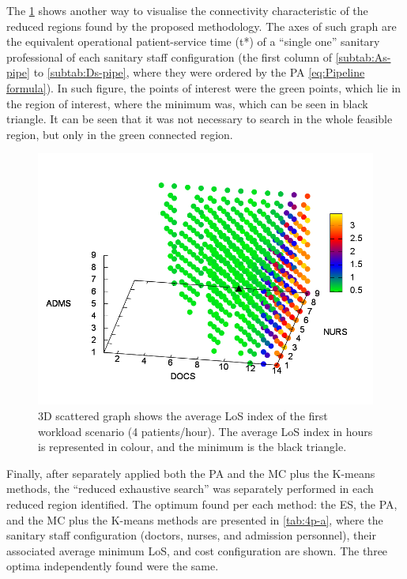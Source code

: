 The \ref{fig:3D-scattered-graph-25} shows another way to visualise
the connectivity characteristic of the reduced regions found by the
proposed methodology. The axes of such graph are the equivalent operational
patient-service time \foreignlanguage{american}{(t{*})} of a ``single
one'' sanitary professional of each sanitary staff configuration
(the first column of \ref{subtab:As-pipe} to \ref{subtab:Ds-pipe},
where they were ordered by the PA \ref{eq:Pipeline formula}). In
such figure, the points of interest were the green points, which lie
in the region of interest, where the minimum was, which can be seen
in black triangle. It can be seen that it was not necessary to search
in the whole feasible region, but only in the green connected region. 

\begin{figure}[h]
\noindent \begin{centering}
\includegraphics[width=0.95\columnwidth,height=0.2\paperheight]{figs4/v0/6400-602-25-3D-scatter-LoS2}
\par\end{centering}

\caption{3D scattered graph shows the average LoS index of the first workload
scenario (4 patients/hour). The average LoS index in hours is represented
in colour, and the minimum is the black triangle.\label{fig:3D-scattered-graph-25} }
\end{figure}


Finally, after separately applied both the PA and the MC plus the
K-means methods, the \textquotedblleft{}reduced exhaustive search\textquotedblright{}
was separately performed in each reduced region identified. The optimum
found per each method: the ES, the PA, and the MC plus the K-means
methods are presented in \ref{tab:4p-a}, where the sanitary staff
configuration (doctors, nurses, and admission personnel), their associated
average minimum LoS, and cost configuration are shown. The three optima
independently found were the same. 

